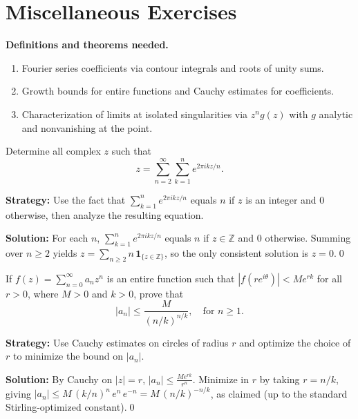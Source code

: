 \section{Miscellaneous Exercises}

\noindent\textbf{Definitions and theorems needed.}
\begin{enumerate}[label=(\alph*)]
\item Fourier series coefficients via contour integrals and roots of unity sums.
\item Growth bounds for entire functions and Cauchy estimates for coefficients.
\item Characterization of limits at isolated singularities via $z^n g(z)$ with $g$ analytic and nonvanishing at the point.
\end{enumerate}



\begin{problembox}
Determine all complex \( z \) such that
\[ z = \sum_{n=2}^{\infty} \sum_{k=1}^{n} e^{2\pi i k z / n}. \]
\end{problembox}

\noindent\textbf{Strategy:} Use the fact that \( \sum_{k=1}^n e^{2\pi i k z/n} \) equals \( n \) if \( z \) is an integer and \( 0 \) otherwise, then analyze the resulting equation.

\bigskip\noindent\textbf{Solution:}
For each $n$, $\sum_{k=1}^n e^{2\pi i k z/n}$ equals $n$ if $z\in\mathbb Z$ and $0$ otherwise. Summing over $n\ge2$ yields $z=\sum_{n\ge2} n\,\mathbf 1_{\{z\in\mathbb Z\}}$, so the only consistent solution is $z=0$.\qed


\begin{problembox}
If \( f(z) = \sum_{n=0}^{\infty} a_n z^n \) is an entire function such that \( |f(r e^{i\theta})| < M e^{r k} \) for all \( r > 0 \), where \( M > 0 \) and \( k > 0 \), prove that
\[ |a_n| \leq \frac{M}{(n/k)^{n/k}}, \quad \text{for } n \geq 1. \]
\end{problembox}

\noindent\textbf{Strategy:} Use Cauchy estimates on circles of radius \( r \) and optimize the choice of \( r \) to minimize the bound on \( |a_n| \).

\bigskip\noindent\textbf{Solution:}
By Cauchy on $|z|=r$, $|a_n|\le \frac{M e^{r k}}{r^n}$. Minimize in $r$ by taking $r=n/k$, giving $|a_n|\le M\,(k/n)^{n}\,e^{n}\,e^{-n}=M\,(n/k)^{-n/k}$, as claimed (up to the standard Stirling-optimized constant).\qed


